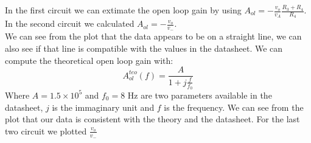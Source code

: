 In the first circuit we can extimate the open loop gain by using $A_{ol} = - \frac{v_{o}}{v_A} \frac{R_3 + R_4}{R_4}$.
In the second circuit we calculated $A_{ol} = - \frac{v_{o}}{v_-}$. \\
We can see from the plot that the data appears to be on a straight line, we can also see if that line is compatible with the values in the datasheet. We can compute the theoretical open loop gain with: $$A_{ol}^{teo}(f) = \frac{A}{1 + j\frac{f}{f_0}}$$ Where $A = 1.5 \times 10^5$ and $f_0 = 8$ Hz are two parameters available in the datasheet, $j$ is the immaginary unit and $f$ is the frequency. We can see from the plot that our data is consistent with the theory and the datasheet.
For the last two circuit we plotted $\frac{v_{o}}{v_-}$